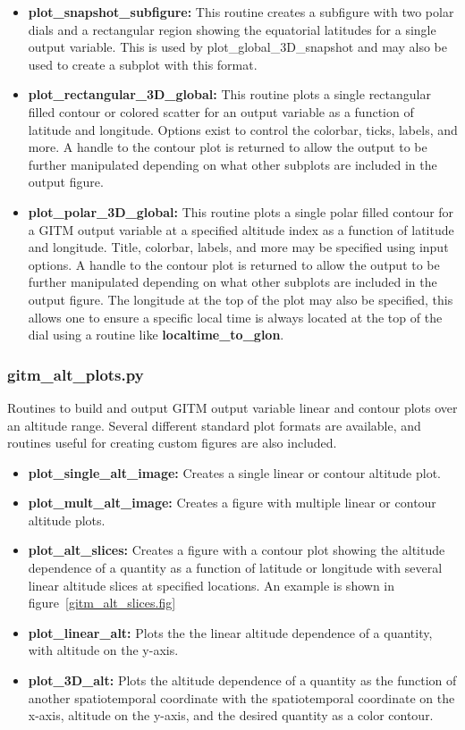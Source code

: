 \begin{itemize}
\item[]{{\bf plot\_snapshot\_subfigure:}  This routine creates a subfigure with two polar dials and a rectangular region showing the equatorial latitudes for a single output variable.  This is used by plot\_global\_3D\_snapshot and may also be used to create a subplot with this format.}
\item[]{{\bf plot\_rectangular\_3D\_global:} This routine plots a single rectangular filled contour or colored scatter for an output variable as a function of latitude and longitude.  Options exist to control the colorbar, ticks, labels, and more.  A handle to the contour plot is returned to allow the output to be further manipulated depending on what other subplots are included in the output figure.} 
\item[]{{\bf plot\_polar\_3D\_global:} This routine plots a single polar filled contour for a GITM output variable at a specified altitude index as a function of latitude and longitude.  Title, colorbar, labels, and more may be specified using input options.  A handle to the contour plot is returned to allow the output to be further manipulated depending on what other subplots are included in the output figure.  The longitude at the top of the plot may also be specified, this allows one to ensure a specific local time is always located at the top of the dial using a routine like {\bf localtime\_to\_glon}.} 
\end{itemize}

\subsubsection{gitm\_alt\_plots.py}

Routines to build and output GITM output variable linear and contour plots over an altitude range.  Several different standard plot formats are available, and routines useful for creating custom figures are also included.

\begin{itemize}
\item[]{{\bf plot\_single\_alt\_image:}  Creates a single linear or contour altitude plot.}
\item[]{{\bf plot\_mult\_alt\_image:}  Creates a figure with multiple linear or contour altitude plots.}
\item[]{{\bf plot\_alt\_slices:}  Creates a figure with a contour plot showing the altitude dependence of a quantity as a function of latitude or longitude with several linear altitude slices at specified locations.  An example is shown in figure~\ref{gitm_alt_slices.fig}}
\item[]{{\bf plot\_linear\_alt:}  Plots the the linear altitude dependence of a quantity, with altitude on the y-axis.}
\item[]{{\bf plot\_3D\_alt:}  Plots the altitude dependence of a quantity as the function of another spatiotemporal coordinate with the spatiotemporal coordinate on the x-axis, altitude on the y-axis, and the desired quantity as a color contour.}
\end{itemize}

